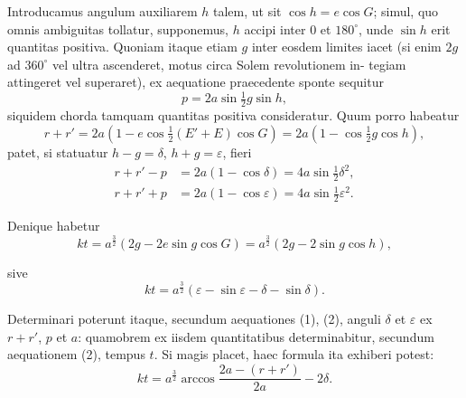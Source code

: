 \documentclass[12pt,a4paper]{article}
\newcommand{\ee}{e}
\begin{document}
Introducamus angulum auxiliarem $h$ talem, ut sit $\cos h = \ee\cos G$; simul, quo
omnis ambiguitas tollatur, supponemus, $h$ accipi inter $0$ et $180^\circ$, unde $\sin h$
erit quantitas positiva. Quoniam itaque etiam $g$ inter eosdem limites iacet
(si enim $2g$ ad $360^\circ$ vel ultra ascenderet, motus circa Solem revolutionem in-
tegiam attingeret vel superaret), ex aequatione praecedente sponte sequitur
\[
p = 2a\sin\tfrac{1}{2}g\sin h,
\]
siquidem chorda tamquam quantitas positiva consideratur. Quum porro habeatur
\[
r + r' = 2a(1 - \ee\cos\tfrac{1}{2}(E'+E)\cos G) = 2a(1 - \cos\tfrac{1}{2}g\cos h),
\]
patet, si statuatur $h - g = \delta$, $h + g = \varepsilon$, fieri
\begin{align}
r + r' - p &= 2a(1 - \cos\delta) = 4a\sin\tfrac{1}{2}\delta^2, \tag{1} \\
r + r' + p &= 2a(1 - \cos\varepsilon) = 4a\sin\tfrac{1}{2}\varepsilon^2. \tag{2}
\end{align}

Denique habetur
\[
kt = a^{\frac{3}{2}}(2g - 2\ee\sin g\cos G) = a^{\frac{3}{2}}(2g - 2\sin g\cos h),
\]

sive
\begin{equation}
kt = a^{\frac{3}{2}}(\varepsilon - \sin\varepsilon - \delta - \sin\delta). \tag{3}
\end{equation}

Determinari poterunt itaque, secundum aequationes (1), (2), anguli $\delta$ et $\varepsilon$ ex
$r + r'$, $p$ et $a$: quamobrem ex iisdem quantitatibus determinabitur, secundum
aequationem (2), tempus $t$. Si magis placet, haec formula ita exhiberi potest:
\[
kt = a^{\frac{3}{2}}\arccos\frac{2a - (r+r')}{2a} - 2\delta.
\]
\end{document}
